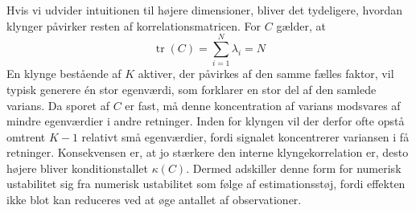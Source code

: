 \documentclass[../main.tex]{subfiles}
\begin{document}
Hvis vi udvider intuitionen til højere dimensioner, bliver det tydeligere, hvordan klynger påvirker resten af korrelationsmatricen. For $C$ gælder, at
\begin{equation}
    \operatorname{tr}(C) = \sum_{i=1}^{N} \lambda_i=N
    \label{eq:c_trace}
\end{equation}
En klynge bestående af $K$ aktiver, der påvirkes af den samme fælles faktor, vil typisk generere én stor egenværdi, som forklarer en stor del af den samlede varians. Da sporet af $C$ er fast, må denne koncentration af varians modsvares af mindre egenværdier i andre retninger. Inden for klyngen vil der derfor ofte opstå omtrent $K-1$ relativt små egenværdier, fordi signalet koncentrerer variansen i få retninger. Konsekvensen er, at jo stærkere den interne klyngekorrelation er, desto højere bliver konditionstallet $\kappa(C)$. Dermed adskiller denne form for numerisk ustabilitet sig fra numerisk ustabilitet som følge af estimationsstøj, fordi effekten ikke blot kan reduceres ved at øge antallet af observationer.\cite{lopez_de_prado_robust_2019}

\ifSubfilesClassLoaded{
    
    
}{}
\end{document}
